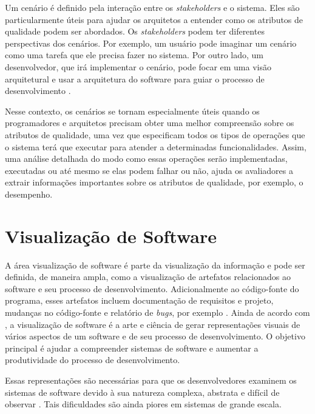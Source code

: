 Um cenário é definido pela interação entre os \textit{stakeholders} e o sistema. Eles são particularmente úteis para ajudar os arquitetos a entender como os atributos de qualidade podem ser abordados. Os \textit{stakeholders} podem ter diferentes perspectivas dos cenários. Por exemplo, um usuário pode imaginar um cenário como uma tarefa que ele precisa fazer no sistema. Por outro lado, um desenvolvedor, que irá implementar o cenário, pode focar em uma visão arquitetural e usar a arquitetura do software para guiar o processo de desenvolvimento \cite{Pinto2015}.

Nesse contexto, os cenários se tornam especialmente úteis quando os programadores e arquitetos precisam obter uma melhor compreensão sobre os atributos de qualidade, uma vez que especificam todos os tipos de operações que o sistema terá que executar para atender a determinadas funcionalidades. Assim, uma análise detalhada do modo como essas operações serão implementadas, executadas ou até mesmo se elas podem falhar ou não, ajuda os avaliadores a extrair informações importantes sobre os atributos de qualidade, por exemplo, o desempenho.

\section{Visualização de Software} \label{sec:visualizacao-software}

A área visualização de software é parte da visualização da informação e pode ser definida, de maneira ampla, como a visualização de artefatos relacionados ao software e seu processo de desenvolvimento. Adicionalmente ao código-fonte do programa, esses artefatos incluem documentação de requisitos e projeto, mudanças no código-fonte e relatório de \textit{bugs}, por exemplo \cite{Diehl2007}. Ainda de acordo com \citeauthor{Diehl2007}, a visualização de software é a arte e ciência de gerar representações visuais de vários aspectos de um software e de seu processo de desenvolvimento. O objetivo principal é ajudar a compreender sistemas de software e aumentar a produtividade do processo de desenvolvimento.

Essas representações são necessárias para que os desenvolvedores examinem os sistemas de software devido à sua natureza complexa, abstrata e difícil de observar \cite{Petre2006}. Tais dificuldades são ainda piores em sistemas de grande escala.

